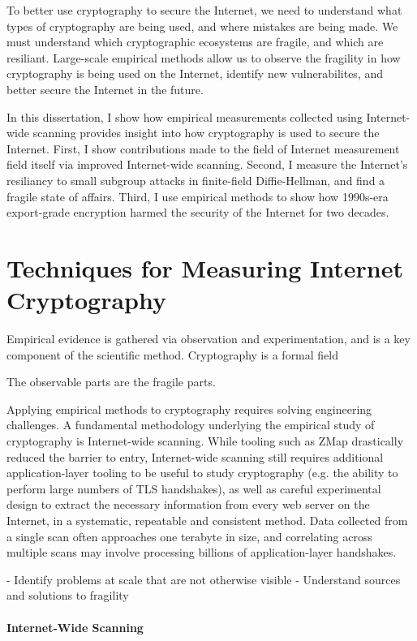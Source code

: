 To better use cryptography to secure the Internet, we need to understand what
types of cryptography are being used, and where mistakes are being made. We
must understand which cryptographic ecosystems are fragile, and which are
resiliant. Large-scale empirical methods allow us to observe the fragility in
how cryptography is being used on the Internet, identify new vulnerabilites,
and better secure the Internet in the future.

In this dissertation, I show how empirical measurements collected using
Internet-wide scanning provides insight into how cryptography is used to
secure the Internet. First, I show contributions made to the field of
Internet measurement field itself via improved Internet-wide scanning.
Second, I measure the Internet's resiliancy to small subgroup attacks in
finite-field Diffie-Hellman, and find a fragile state of affairs. Third, I
use empirical methods to show how 1990s-era export-grade encryption harmed
the security of the Internet for two decades.

\section{Techniques for Measuring Internet Cryptography}

Empirical evidence is gathered via observation and experimentation, and is a
key component of the scientific method. Cryptography is a formal field 

The observable parts are the fragile parts.

Applying empirical methods to cryptography requires solving engineering
challenges. A fundamental methodology underlying the empirical study of
cryptography is Internet-wide scanning. While tooling such as ZMap drastically
reduced the barrier to entry, Internet-wide scanning still requires additional
application-layer tooling to be useful to study cryptography (e.g. the ability
to perform large numbers of TLS handshakes), as well as careful experimental
design to extract the necessary information from every web server on the
Internet, in a systematic, repeatable and consistent method. Data collected
from a single scan often approaches one terabyte in size, and correlating
across multiple scans may involve processing billions of application-layer
handshakes.

- Identify problems at scale that are not otherwise visible
- Understand sources and solutions to fragility

\paragraph{Internet-Wide Scanning}

